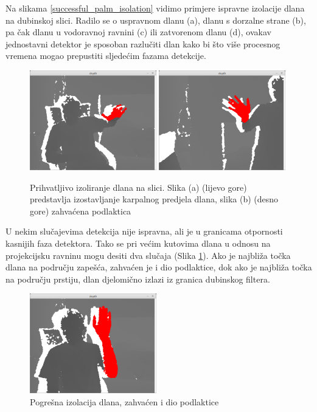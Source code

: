 \documentclass[times, utf8, diplomski, numeric]{fer}
\begin{document}
Na slikama \ref{successful_palm_isolation} vidimo primjere ispravne izolacije dlana na dubinskoj slici. Radilo se o uspravnom dlanu (a), dlanu s dorzalne strane (b), pa čak dlanu u vodoravnoj ravnini (c) ili zatvorenom dlanu (d), ovakav jednostavni detektor je sposoban razlučiti dlan kako bi što više procesnog vremena mogao prepustiti sljedećim fazama detekcije.
\begin{figure}[h!]
\centering
\includegraphics[width = 0.49\textwidth]{detekcija/izolacija-zadovoljavajuce-1}
\includegraphics[width = 0.49\textwidth]{detekcija/izolacija-zadovoljavajuce-2}
\caption{Prihvatljivo izoliranje dlana na slici. 
Slika (a) (lijevo gore) predstavlja izostavljanje karpalnog predjela dlana, 
slika (b) (desno gore) zahvaćena podlaktica} \label{satisfactorily_palm_isolation}
\end{figure}

U nekim slučajevima detekcija nije ispravna, ali je u granicama otpornosti kasnijih faza detektora. Tako se pri većim kutovima dlana u odnosu na projekcijsku ravninu mogu desiti dva slučaja (Slika \ref{satisfactorily_palm_isolation}). Ako je najbliža točka dlana na području zapešća, zahvaćen je i dio podlaktice, dok ako je najbliža točka na području prstiju, dlan djelomično izlazi iz granica dubinskog filtera.

\begin{figure}[h!]
\centering
\includegraphics[width = 0.49\textwidth]{detekcija/izolacija-krivo-1}
\caption{Pogrešna izolacija dlana, zahvaćen i dio podlaktice} \label{poor_palm_isolation}
\end{figure}
\end{document}
